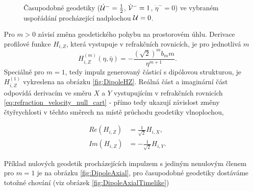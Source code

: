 \begin{figure}[ht]
    \centering
    \caption{Časupodobné geodetiky ($\dot {\mathcal{U}}^-=\frac{1}{2}$, $\dot {\mathcal{V}}^-=1$, $\dot \eta^-=0$) ve vybraném uspořádání procházející nadplochou $\mathcal{U} = 0$.}
    \label{fig:AsMatterNonAxial}
\end{figure}
Pro $m>0$ závisí změna geodetického pohybu na prostorovém úhlu. Derivace profilové funkce $H_{i,Z}$, která vystupuje v refrakčních rovnicích, je pro jednotlivá $m$
\begin{equation}
    H_{i,Z}^{(m)}(\eta, \bar{\eta}) = -\frac{(\sqrt{2})^{m} b_m m}{\eta^{m+1}}.
\end{equation}
Speciálně pro $m=1$, tedy impulz generovaný částicí s dipólovou strukturou, je $H_{i,Z}^{(1)}$ vykreslena na obrázku \ref{fig:DipoleHZ}. Reálná část a imaginární část
odpovídá derivacím ve směru $X$ a $Y$ vystupujícím v refrakčních rovnicích \eqref{eq:refraction_velocity_null_cart} - přímo tedy ukazují závislost změny čtyřrychlosti v těchto směrech na místě průchodu geodetiky vlnoplochou,

\begin{equation}
    \begin{split}
        Re(H_{i,Z}) &= \frac{1}{\sqrt{2}} H_{i,X}, \\
        Im(H_{i,Z}) &=-\frac{1}{\sqrt{2}}H_{i,Y}.
    \end{split}
\end{equation}


Příklad nulových geodetik procházejících impulzem s jediným nenulovým členem pro $m=1$ je na obrázku \ref{fig:DipoleAxial}, pro časupodobné geodetiky dostáváme totožné
chování (viz obrázek \ref{fig:DipoleAxialTimelike})

